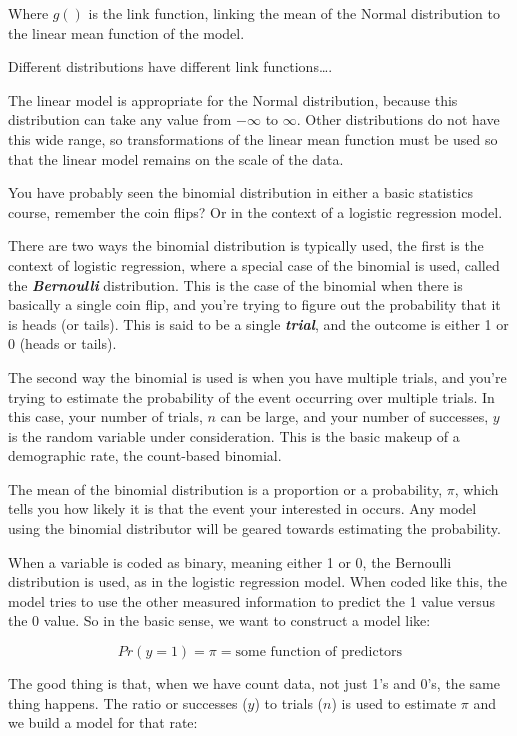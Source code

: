 \documentclass[
]{article}
\begin{document}
Where \(g()\) is the link function, linking the mean of the Normal distribution to the linear mean function of the model.

Different distributions have different link functions\ldots.

The linear model is appropriate for the Normal distribution, because this distribution can take any value from \(- \infty\) to \(\infty\). Other distributions do not have this wide range, so transformations of the linear mean function must be used so that the linear model remains on the scale of the data.

You have probably seen the binomial distribution in either a basic statistics course, remember the coin flips? Or in the context of a logistic regression model.

There are two ways the binomial distribution is typically used, the first is the context of logistic regression, where a special case of the binomial is used, called the \textbf{\emph{Bernoulli}} distribution. This is the case of the binomial when there is basically a single coin flip, and you're trying to figure out the probability that it is heads (or tails). This is said to be a single \textbf{\emph{trial}}, and the outcome is either 1 or 0 (heads or tails).

The second way the binomial is used is when you have multiple trials, and you're trying to estimate the probability of the event occurring over multiple trials. In this case, your number of trials, \(n\) can be large, and your number of successes, \(y\) is the random variable under consideration. This is the basic makeup of a demographic rate, the count-based binomial.

The mean of the binomial distribution is a proportion or a probability, \(\pi\), which tells you how likely it is that the event your interested in occurs. Any model using the binomial distributor will be geared towards estimating the probability.

When a variable is coded as binary, meaning either 1 or 0, the Bernoulli distribution is used, as in the logistic regression model. When coded like this, the model tries to use the other measured information to predict the 1 value versus the 0 value. So in the basic sense, we want to construct a model like:

\[Pr(y=1) =\pi =  \text{some function of predictors}\]

The good thing is that, when we have count data, not just 1's and 0's, the same thing happens. The ratio or successes (\(y\)) to trials (\(n\)) is used to estimate \(\pi\) and we build a model for that rate:
\end{document}
